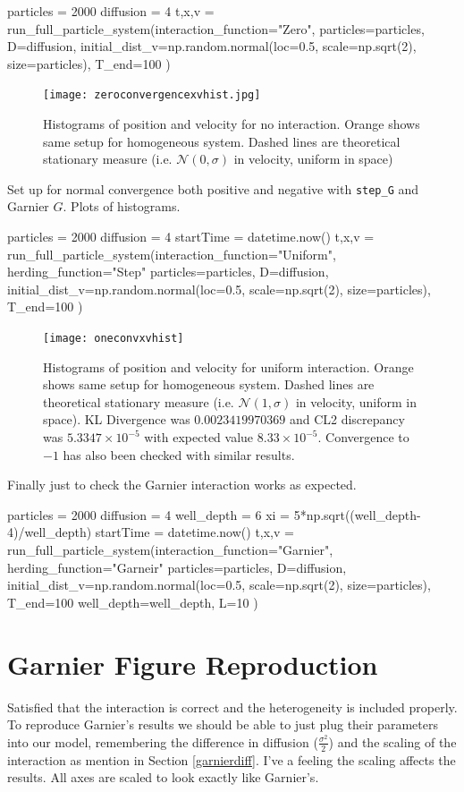 \documentclass[11pt,a4paper, dvipsnames]{article}
\begin{document}
\begin{python}
particles = 2000
diffusion = 4
t,x,v = run_full_particle_system(interaction_function="Zero",
particles=particles,
D=diffusion,
initial_dist_v=np.random.normal(loc=0.5, scale=np.sqrt(2), size=particles),
T_end=100
)
\end{python}
\begin{figure}
    \centering
    \texttt{[image: zeroconvergencexvhist.jpg]}
    \caption{Histograms of position and velocity for no interaction. Orange shows same setup for homogeneous system. Dashed lines are theoretical stationary measure (i.e. $\mathcal{N}(0,\sigma)$ in velocity, uniform in space)}
\end{figure}


Set up for normal convergence both positive and negative with \verb|step_G| and Garnier $G$. Plots of histograms. 

\begin{python}
particles = 2000
diffusion = 4
startTime = datetime.now()
t,x,v = run_full_particle_system(interaction_function="Uniform", 
herding_function="Step"
particles=particles,
D=diffusion,
initial_dist_v=np.random.normal(loc=0.5, scale=np.sqrt(2), size=particles),
T_end=100
)
\end{python}
\begin{figure}
    \centering
    \texttt{[image: oneconvxvhist]}
    \caption{Histograms of position and velocity for uniform interaction. Orange shows same setup for homogeneous system. Dashed lines are theoretical stationary measure (i.e. $\mathcal{N}(1,\sigma)$ in velocity, uniform in space). KL Divergence was $0.0023419970369$ and CL2 discrepancy was $5.3347 \times 10 ^{-5}$ with expected value $8.33\times 10^{-5}$. Convergence to $-1$ has also been checked with similar results.}
\end{figure}
Finally just to check the Garnier interaction works as expected.
\begin{python}
particles = 2000
diffusion = 4
well_depth = 6
xi = 5*np.sqrt((well_depth-4)/well_depth)
startTime = datetime.now()
t,x,v = run_full_particle_system(interaction_function="Garnier", 
herding_function="Garneir"
particles=particles,
D=diffusion,
initial_dist_v=np.random.normal(loc=0.5, scale=np.sqrt(2), size=particles),
T_end=100
well_depth=well_depth,
L=10
)
\end{python}

    \section{Garnier Figure Reproduction}
    Satisfied that the interaction is correct and the heterogeneity is included properly. To reproduce Garnier's results we should be able to just plug their parameters into our model, remembering the difference in diffusion ($\frac{\sigma^2}{2}$) and the scaling of the interaction as mention in Section \ref{garnierdiff}. I've a feeling the scaling affects the results. All axes are scaled to look exactly like Garnier's.
\end{document}
